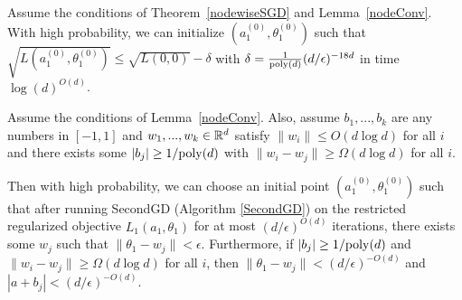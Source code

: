  \begin{lemma}\label{nodeInitialize}
Assume the conditions of Theorem~\ref{nodewiseSGD} and Lemma~\ref{nodeConv}. With high probability, we can initialize $(a_1^{(0)},\theta_1^{(0)})$ such that $\sqrt{L(a_1^{(0)},\theta_1^{(0)})} \leq \sqrt{L({0,0})} -\delta$ with $\delta = \frac{1}{\mathrm{poly}(d)}(d/\epsilon)^{ -18d}$ in time $\log(d)^{O(d)}$.
 \end{lemma}
%
\begin{lemma}\label{nodewiseSGD}
Assume the conditions of Lemma~\ref{nodeConv}. Also, assume $b_1,...,b_k$ are any numbers in $[-1,1]$ and $w_1,...,w_k \in {\mathbb{R}}^d$ satisfy $\|w_i\|\leq O(d\log d)$ for all $i$ and there exists some $|b_j| \geq 1/\mathrm{poly}(d)$ with $\|w_i - w_j\| \geq \Omega(d\log d)$ for all $i$.

Then with high probability, we can choose an initial point $(a_1^{(0)}, \theta_1^{(0)})$ such that after running SecondGD (Algorithm \ref{SecondGD}) on the restricted regularized objective $L_1(a_1,\theta_1)$ for at most $(d/\epsilon)^{O(d)}$ iterations, there exists some $w_j$ such that $\|\theta_1 - w_j\| < \epsilon$. Furthermore, if $|b_j| \geq 1/\mathrm{poly}(d)$ and $\|w_i - w_j\| \geq \Omega(d\log d)$ for all $i$, then $\|\theta_1 - w_j\| < (d/\epsilon)^{-O(d)}$ and $|a + b_j| < (d/\epsilon)^{-O(d)}$.
\end{lemma}

\nodewise*



